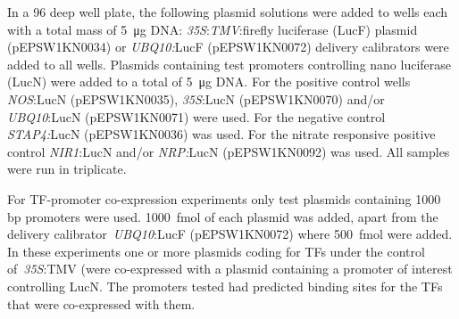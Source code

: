 In a 96 deep well plate, the following plasmid solutions were added to
wells each with a total mass of \SI{5}{\micro\gram} DNA: \textit{35S}:\textit{TMV}:firefly
luciferase (LucF) plasmid (pEPSW1KN0034) or \textit{UBQ10:}LucF
(pEPSW1KN0072) delivery calibrators were added to all wells. Plasmids
containing test promoters controlling nano luciferase (LucN) were added to a total of \SI{5}{\micro\gram} DNA. For the positive control wells \textit{NOS}:LucN
(pEPSW1KN0035), \textit{35S}:LucN (pEPSW1KN0070) and/or \textit{UBQ10}:LucN
(pEPSW1KN0071) were used. For the negative control \textit{STAP4:}LucN
(pEPSW1KN0036) was used. For the nitrate responsive positive
control \textit{NIR1}:LucN and/or \textit{NRP:}LucN (pEPSW1KN0092) was used. All samples were run in triplicate.

For TF\hyp{}promoter co\hyp{}expression experiments only test plasmids containing 1000 bp promoters were used. \SI{1000}{\fmol} of each plasmid was added, apart
from the delivery calibrator~\textit{UBQ10}:LucF (pEPSW1KN0072) where \SI{500}{\fmol} were added. In these experiments one or more plasmids coding for
TFs under the control of~\textit{35S}:TMV (were co\hyp{}expressed with a plasmid containing a promoter of interest controlling LucN. The promoters tested had predicted binding sites for the TFs that were co\hyp{}expressed with them.

